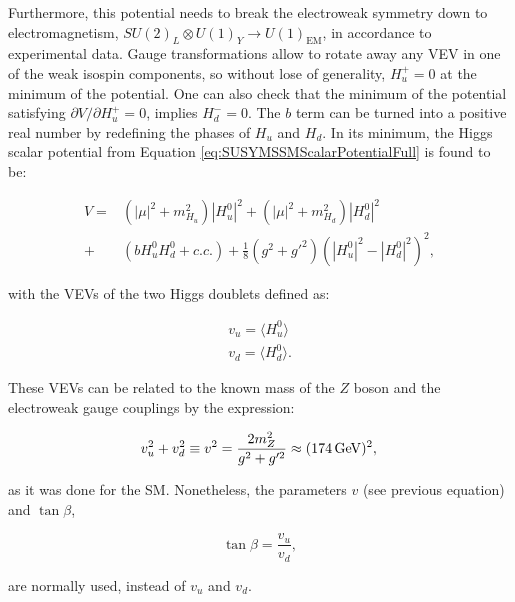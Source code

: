 Furthermore, this potential needs to break the electroweak symmetry down to electromagnetism, $SU(2)_L\otimes U(1)_Y \rightarrow U(1)_{\text{EM}}$, in accordance to experimental data.
Gauge transformations allow to rotate away any VEV in one of the weak isospin components, so without lose of generality, $H_u^+ = 0$ at the minimum of the potential.
One can also check that the minimum of the potential satisfying $\partial V / \partial H_u^+ = 0$, implies $H_d^- = 0$.
The $b$ term can be turned into a positive real number by redefining the phases of $H_u$ and $H_d$.
In its minimum, the Higgs scalar potential from Equation \ref{eq:SUSYMSSMScalarPotentialFull} is found to be:

\begin{equation}
\begin{split}
V = & (|\mu|^2 + m_{H_u}^2) |H_u^0|^2
+ (|\mu|^2 + m_{H_d}^2) |H_d^0|^2 \\
+ &(b H_u^0 H_d^0 + c.c.)
+ \frac{1}{8}(g^2 + g'^2)(|H_u^0|^2 - |H_d^0|^2)^2,
\end{split}
\label{eq:SUSYMSSMScalarPotential}
\end{equation}

\noindent with the VEVs of the two Higgs doublets defined as:

\begin{equation}
\begin{split}
v_u = \langle H_u^0 \rangle \\
v_d = \langle H_d^0 \rangle.
\end{split}
\label{eq:SUSYVEVsDefinition}
\end{equation}

These VEVs can be related to the known mass of the $Z$ boson and the electroweak gauge couplings by the expression:

\begin{equation}
v_u^2 + v_d^2 \equiv v^2 = \frac{2m_Z^2}{g^2 + g'^2} \approx (\unit[174]{GeV})^2, \\
\label{eq:SUSYZMass}
\end{equation}

\noindent as it was done for the SM.
Nonetheless, the parameters $v$ (see previous equation) and $\tan\beta$,

\begin{equation}
\tan\beta = \frac{v_u}{v_d},
\label{eq:TanBetaDefinition}
\end{equation}

\noindent are normally used, instead of $v_u$ and $v_d$.


